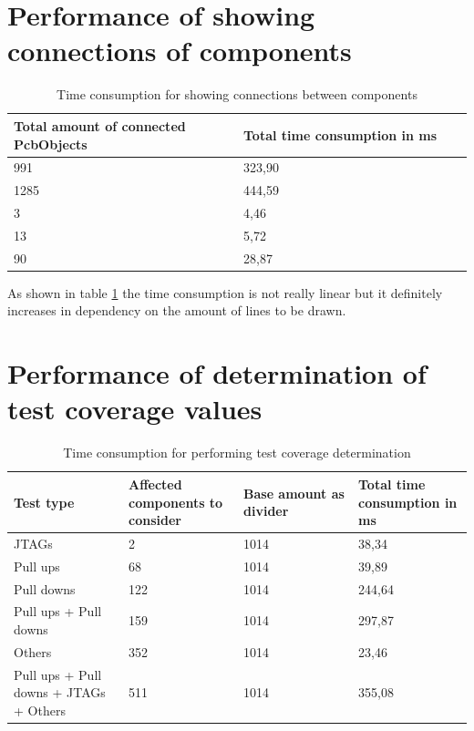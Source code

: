 	\section{Performance of showing connections of components}

\begin{table}[!h]
    \centering
    \begin{tabular}{p{0.50\linewidth} | p{0.50\linewidth}}
      Total amount of connected PcbObjects & Total time consumption in ms \\ \hline
      991 & 323,90 \\ \hline
      1285 & 444,59 \\ \hline
			3 & 4,46 \\ \hline
			13 & 5,72 \\ \hline
			90 & 28,87 \\
    \end{tabular}
    \caption{Time consumption for showing connections between components}
    \label{tab:timeConnections}
\end{table}

As shown in table \ref{tab:timeConnections} the time consumption is not really linear but it definitely increases in dependency on the amount of lines to be drawn.

	\section{Performance of determination of test coverage values}
\begin{table}[!h]
    \centering
    \begin{tabular}{p{0.25\linewidth} | p{0.25\linewidth} | p{0.25\linewidth} | p{0.25\linewidth}}
      Test type & Affected components to consider & Base amount as divider & Total time consumption in ms \\ \hline
      JTAGs & 2 & 1014 & 38,34 \\ \hline
      Pull ups & 68 & 1014 & 39,89 \\ \hline
			Pull downs & 122 & 1014 & 244,64 \\ \hline
			Pull ups + Pull downs & 159 & 1014 & 297,87 \\ \hline
			Others & 352 & 1014 & 23,46 \\ \hline
			Pull ups + Pull downs + JTAGs + Others & 511 & 1014 & 355,08 \\
    \end{tabular}
    \caption{Time consumption for performing test coverage determination}
    \label{tab:timeTestCoverage}
\end{table}

